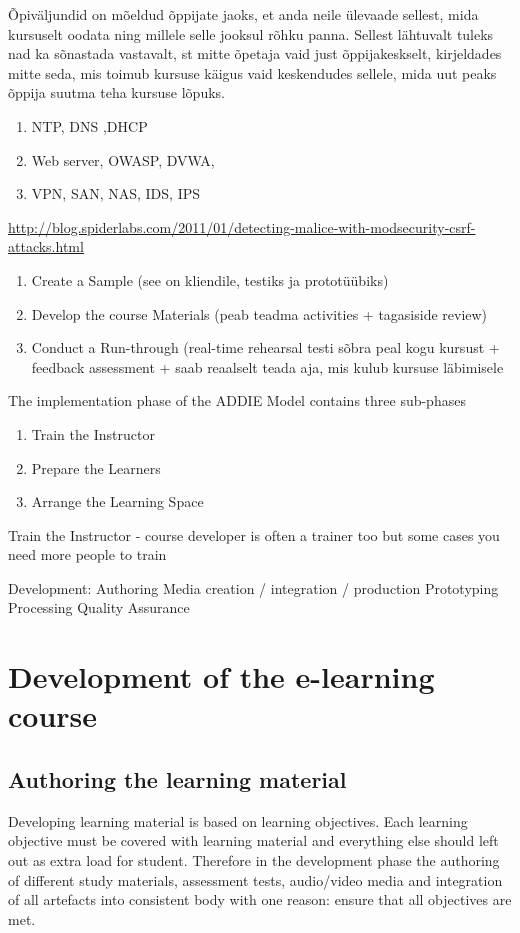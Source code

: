 Õpiväljundid on mõeldud õppijate jaoks, et anda neile ülevaade sellest, mida kursuselt oodata ning
millele selle jooksul rõhku panna. Sellest lähtuvalt tuleks nad ka sõnastada vastavalt, st mitte õpetaja
vaid just õppijakeskselt, kirjeldades mitte seda, mis toimub kursuse käigus vaid keskendudes sellele,
mida uut peaks õppija suutma teha kursuse lõpuks.

\begin{enumerate}[label=Learning Objective \arabic*.,leftmargin=*]
\item NTP, DNS ,DHCP
\item Web server, OWASP, DVWA,
\item VPN, SAN, NAS, IDS, IPS
\end{enumerate}

\url{http://blog.spiderlabs.com/2011/01/detecting-malice-with-modsecurity-csrf-attacks.html}



\begin{enumerate}
\item Create a Sample (see on kliendile, testiks ja prototüübiks)
\item Develop the course Materials (peab teadma activities + tagasiside review)
\item Conduct a Run-through (real-time rehearsal testi sõbra peal kogu kursust +  feedback assessment + saab reaalselt teada aja, mis kulub kursuse läbimisele
\end{enumerate}


The implementation phase of the ADDIE Model contains three sub-phases

\begin{enumerate}
\item Train the Instructor
\item Prepare the Learners
\item Arrange the Learning Space
\end{enumerate}

Train the Instructor - course developer is often a trainer too but some cases you need more people to train


Development:
Authoring
Media creation / integration / production
Prototyping
Processing
Quality Assurance

\section{Development of the e-learning course}

\subsection{Authoring the learning material}
Developing learning material is based on learning objectives. Each learning objective must be covered with learning material and everything else should left out as extra load for student. Therefore in the development phase the authoring of different study materials, assessment tests, audio/video media and integration of all artefacts into consistent body with one reason: ensure that all objectives are met.

